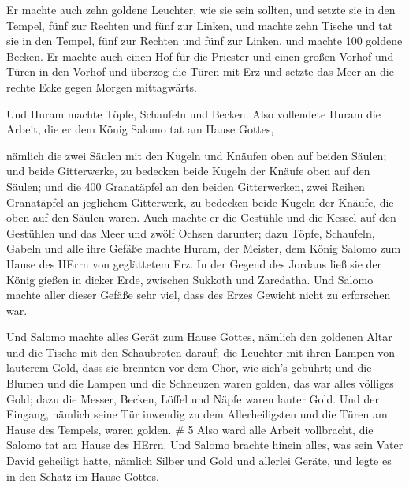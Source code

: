  Er machte auch zehn goldene Leuchter, wie sie sein sollten,
und setzte sie in den Tempel, fünf zur Rechten und fünf zur Linken,
 und machte zehn Tische und tat sie in den Tempel, fünf zur
Rechten und fünf zur Linken, und machte 100 goldene Becken. 
Er machte auch einen Hof für die Priester und einen großen Vorhof und
Türen in den Vorhof und überzog die Türen mit Erz  und
setzte das Meer an die rechte Ecke gegen Morgen mittagwärts.

 Und Huram machte Töpfe, Schaufeln und Becken. Also
vollendete Huram die Arbeit, die er dem König Salomo tat am Hause
Gottes,

 nämlich die zwei Säulen mit den Kugeln und Knäufen oben
auf beiden Säulen; und beide Gitterwerke, zu bedecken beide Kugeln der
Knäufe oben auf den Säulen;  und die 400 Granatäpfel an den
beiden Gitterwerken, zwei Reihen Granatäpfel an jeglichem Gitterwerk, zu
bedecken beide Kugeln der Knäufe, die oben auf den Säulen waren.
 Auch machte er die Gestühle und die Kessel auf den
Gestühlen  und das Meer und zwölf Ochsen darunter;
 dazu Töpfe, Schaufeln, Gabeln und alle ihre Gefäße machte
Huram, der Meister, dem König Salomo zum Hause des HErrn von geglättetem
Erz.  In der Gegend des Jordans ließ sie der König gießen
in dicker Erde, zwischen Sukkoth und Zaredatha.  Und Salomo
machte aller dieser Gefäße sehr viel, dass des Erzes Gewicht nicht zu
erforschen war.

 Und Salomo machte alles Gerät zum Hause Gottes, nämlich
den goldenen Altar und die Tische mit den Schaubroten darauf;
 die Leuchter mit ihren Lampen von lauterem Gold, dass sie
brennten vor dem Chor, wie sich's gebührt;  und die Blumen
und die Lampen und die Schneuzen waren golden, das war alles völliges
Gold;  dazu die Messer, Becken, Löffel und Näpfe waren
lauter Gold. Und der Eingang, nämlich seine Tür inwendig zu dem
Allerheiligsten und die Türen am Hause des Tempels, waren golden. \# 5
 Also ward alle Arbeit vollbracht, die Salomo tat am Hause
des HErrn. Und Salomo brachte hinein alles, was sein Vater David
geheiligt hatte, nämlich Silber und Gold und allerlei Geräte, und legte
es in den Schatz im Hause Gottes.

